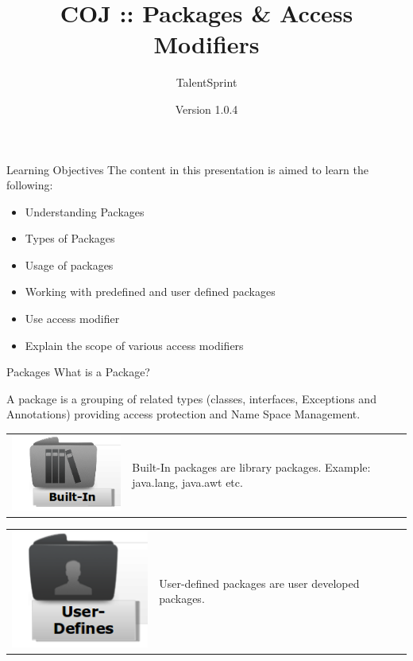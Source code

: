\documentclass[14pt]{beamer}
\title[COJ:Java:01]{COJ :: Packages \& Access Modifiers}
\author[TS]{TalentSprint}
\institute[L\&D]{Licensed To Skill}
\date{Version 1.0.4}
\begin{document}
\begin{frame}
  \titlepage
\end{frame}

\begin{frame}{Learning Objectives}
The content in this presentation is aimed to learn the following:
  \begin{itemize}
  \item Understanding Packages
  \item Types of Packages
  \item Usage of packages
  \item Working with predefined and user defined packages
  \item Use access modifier 
  \item Explain the scope of various access modifiers
  \end{itemize}
\end{frame}

\begin{frame}{Packages}
What is a Package?

A package is a grouping of related types (classes, interfaces, Exceptions and Annotations) providing access protection and Name Space Management.
\begin{tabular}{l l}
\begin{minipage}{0.25\textwidth}
\includegraphics[scale=.4]{built-in-packages.png}
\end{minipage}
&
\begin{minipage}{0.65\textwidth}
Built-In packages are library packages.
  Example: java.lang, java.awt etc.
\end{minipage}
\end{tabular}

\begin{tabular}{l l}
\begin{minipage}{0.25\textwidth}
\includegraphics[scale=.4]{user-defines-packages.png}
\end{minipage}
&
\begin{minipage}{0.65\textwidth}
User-defined packages are user developed packages.
\end{minipage}
\end{tabular}
\end{frame}
\end{document}
